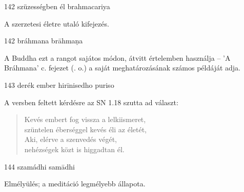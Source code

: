 
\begin{notesdescription}

\item[{142}
{szüzességben él}
{brahmacariya}] \hfill\par

A szerzetesi életre utaló kifejezés.

\item[{142}
{bráhmana}
{brāhmaṇa}] \hfill\par

A Buddha ezt a rangot sajátos módon, átvitt értelemben használja -- 'A Bráhmana' c. fejezet (\pageref{brahmana-vagga}. o.) a saját meghatározásának számos példáját adja.

\item[{143}
{derék ember}
{hirīnisedho puriso}] \hfill\par

A versben feltett kérdésre az SN 1.18 szutta ad választ:

\begin{verse}
Kevés embert fog vissza a lelkiismeret,\\
szüntelen éberséggel kevés éli az életét,\\
Aki, elérve a szenvedés végét,\\
nehézségek közt is higgadtan él.
\end{verse}

\item[{144}
{szamádhi}
{samādhi}] \hfill\par

Elmélyülés; a meditáció legmélyebb állapota.

\end{notesdescription}

